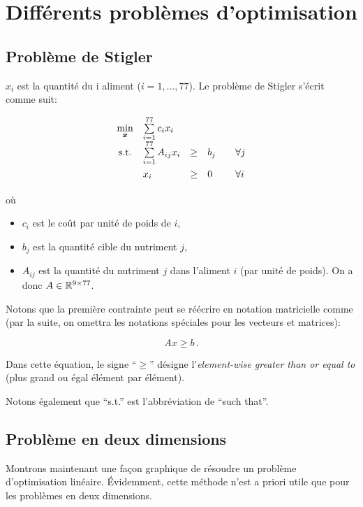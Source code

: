 \section{Différents problèmes d'optimisation}

\subsection{Problème de Stigler}

	$x_i$ est la quantité du i\ieme{} aliment ($i = 1,\dots,77$).
	Le problème de Stigler s'écrit comme suit:

	\begin{equation*}
	\renewcommand{\arraystretch}{1.5}
	\begin{array}{c@{\quad} l c l@{\qquad} l}
		\min\limits_{\bm{x}} & \sum\limits_{i = 1}^{77} c_i x_i & & & \\
		\textnormal{s.t.} & \sum\limits_{i = 1}^{77} A_{ij} x_i & \ge & b_j & \forall j\\
		& x_i & \ge & 0 & \forall i
	\end{array}
	\end{equation*}

	où

	\begin{itemize}
		\item $c_i$ est le coût par unité de poids de $i$,
		\item $b_j$ est la quantité cible du nutriment $j$,
		\item $A_{ij}$ est la quantité du nutriment $j$
		dans l'aliment $i$ (par unité de poids).
		On a donc $A \in \mathbb{R}^{9 \times 77}$.
	\end{itemize}

	Notons que la première contrainte
	peut se réécrire en notation matricielle comme
	(par la suite,
	on omettra les notations spéciales pour les vecteurs et matrices):

	\[
	Ax \ge b\,.
	\]

	Dans cette équation,
	le signe ``$\ge$'' désigne
	l'\emph{element-wise greater than or equal to}
	(plus grand ou égal élément par élément).

	Notons également que ``s.t.'' est l'abbréviation de ``such that''.

\subsection{Problème en deux dimensions}

	Montrons maintenant une façon graphique
	de résoudre un problème d'optimisation linéaire.
	Évidemment, cette méthode n'est a priori utile
	que pour les problèmes en deux dimensions.

